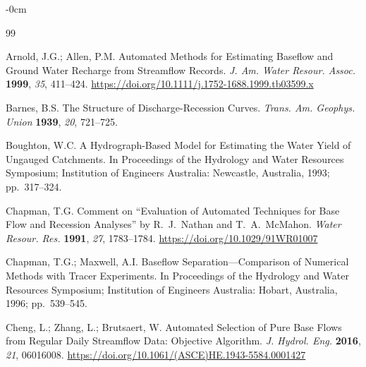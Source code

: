 \documentclass[hydrology,article,submit,pdftex,moreauthors]{Definitions/mdpi}
\begin{document}



\begin{adjustwidth}{-\extralength}{0cm}


\begin{thebibliography}{99}

Arnold, J.G.; Allen, P.M. Automated Methods for Estimating Baseflow and Ground Water Recharge from Streamflow Records. \textit{J. Am. Water Resour. Assoc.} \textbf{1999}, \textit{35}, 411--424. \url{https://doi.org/10.1111/j.1752-1688.1999.tb03599.x}

Barnes, B.S. The Structure of Discharge-Recession Curves. \textit{Trans. Am. Geophys. Union} \textbf{1939}, \textit{20}, 721--725.

Boughton, W.C. A Hydrograph-Based Model for Estimating the Water Yield of Ungauged Catchments. In Proceedings of the Hydrology and Water Resources Symposium; Institution of Engineers Australia: Newcastle, Australia, 1993; pp.~317--324.

Chapman, T.G. Comment on ``Evaluation of Automated Techniques for Base Flow and Recession Analyses'' by R.~J.~Nathan and T.~A.~McMahon. \textit{Water Resour. Res.} \textbf{1991}, \textit{27}, 1783--1784. \url{https://doi.org/10.1029/91WR01007}

Chapman, T.G.; Maxwell, A.I. Baseflow Separation---Comparison of Numerical Methods with Tracer Experiments. In Proceedings of the Hydrology and Water Resources Symposium; Institution of Engineers Australia: Hobart, Australia, 1996; pp.~539--545.

Cheng, L.; Zhang, L.; Brutsaert, W. Automated Selection of Pure Base Flows from Regular Daily Streamflow Data: Objective Algorithm. \textit{J. Hydrol. Eng.} \textbf{2016}, \textit{21}, 06016008. \url{https://doi.org/10.1061/(ASCE)HE.1943-5584.0001427}


\end{thebibliography}
\end{adjustwidth}
\end{document}
